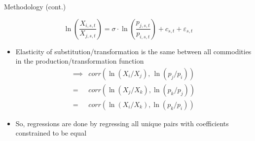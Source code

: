 \documentclass[11pt,aspectratio=169]{beamer}
\begin{document}
\begin{frame}{Methodology (cont.)}


\vspace{0.5em}

\begin{block}{}
	$$\ln\left(\frac{X_{i,s,t}}{X_{j,s,t}}\right) = \sigma \cdot \ln\left(\frac{ p_{j,s,t}}{ p_{i,s,t}}\right) + c_{s,t} + \varepsilon_{s,t}$$
\end{block}

\vspace{-0em}

\begin{itemize}
	
	
	\item Elasticity of substitution/transformation is the same between all commodities in the production/transformation function 
	\begin{align*}
	\implies &corr(\ln(X_i/X_j), \,\ln(p_j / p_i)) \\
	= &corr(\ln(X_j/X_k), \ln(p_k / p_j)) \\
	= &corr(\ln(X_i/X_k), \ln(p_k / p_i))
	\end{align*}
	
	\item So, regressions are done by regressing all unique pairs with coefficients constrained to be equal 
	
	
\end{itemize}

\end{frame}
\end{document}
